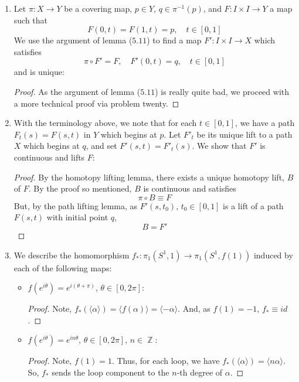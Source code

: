 \documentclass{book}
\DeclareMathOperator*{\Z}{\mathbb{Z}}
\newcommand\innerone[1]{\langle #1 \rangle}
\begin{document}
\begin{enumerate}[(1)]
    \item Let $\pi: X \rightarrow Y$ be a covering map, $p \in Y$, $q \in \pi^{-1}(p)$, and $F: I \times I \rightarrow Y$ a map such that 
        \[F(0,t) = F(1,t) = p, \quad t \in [0,1]\]
        We use the argument of lemma ($5.11$) to find a map $F': I \times I \rightarrow X$ which satisfies 
        \[\pi \circ F' = F, \quad F'(0,t) = q, \quad t \in [0,1]\]
        and is unique: 
        \begin{proof} As the argument of lemma ($5.11$) is really quite bad, we proceed with a more technical proof via problem twenty. 
        \end{proof}

    \item With the terminology above, we note that for each $t \in [0,1]$, we have a path $F_t(s) = F(s,t)$ in $Y$ which begins at $p$. Let $F'_t$ be its unique lift to a path $X$ which begins at $q$, and set $F'(s,t) = F'_t(s)$. We show that $F'$ is continuous and lifts $F$: 
        \begin{proof} By the homotopy lifting lemma, there exists a unique homotopy lift, $B$ of $F$. By the proof so mentioned, $B$ is continuous and satisfies 
            \[\pi \circ B \equiv F\]
            But, by the path lifting lemma, as $F'(s,t_0)$, $t_0 \in [0,1]$ is a lift of a path $F(s,t)$ with initial point $q$, 
            \[B = F'\]
        \end{proof}

    \item We describe the homomorphism $f_*: \pi_1(S^1,1) \rightarrow \pi_1(S^1, f(1))$ induced by each of the following maps: 
        \begin{itemize}
            \item $f(e^{i\theta}) = e^{i(\theta + \pi)}$, $\theta \in [0, 2\pi]$: 
                \begin{proof} Note, $f_*(\innerone{\alpha}) = \innerone{f(\alpha)} = \innerone{-\alpha}$. And, as $f(1) = -1$, $f_* \equiv id$.
                \end{proof}

            \item $f(e^{i\theta}) = e^{in\theta}$, $\theta \in [0,2\pi]$, $n \in \Z$: 
                \begin{proof} Note, $f(1) = 1$. Thus, for each loop, we have $f_*(\innerone{\alpha}) = \innerone{n\alpha}$. So, $f_*$ sends the loop component to the $n$-th degree of $\alpha$. 
                \end{proof}


\end{itemize}
\end{enumerate}
\end{document}
